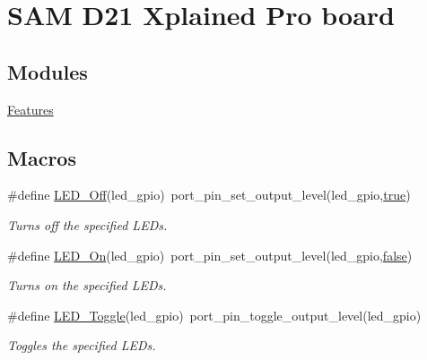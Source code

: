 \hypertarget{group__samd21__xplained__pro__group}{}\section{S\+AM D21 Xplained Pro board}
\label{group__samd21__xplained__pro__group}
\subsection*{Modules}
\begin{DoxyCompactItemize}
\item 
\mbox{\hyperlink{group__samd21__xplained__pro__features__group}{Features}}
\end{DoxyCompactItemize}
\subsection*{Macros}
\begin{DoxyCompactItemize}
\item 
\#define \mbox{\hyperlink{group__samd21__xplained__pro__group_ga4b0995a1d0a6a7bcbaf9f4096cc633c7}{L\+E\+D\+\_\+\+Off}}(led\+\_\+gpio)~port\+\_\+pin\+\_\+set\+\_\+output\+\_\+level(led\+\_\+gpio,\mbox{\hyperlink{group__group__sam0__utils_ga41f9c5fb8b08eb5dc3edce4dcb37fee7}{true}})
\begin{DoxyCompactList}\small\item\em Turns off the specified L\+E\+Ds. \end{DoxyCompactList}\item 
\#define \mbox{\hyperlink{group__samd21__xplained__pro__group_ga589335327be57d2761bfa96c55d62f29}{L\+E\+D\+\_\+\+On}}(led\+\_\+gpio)~port\+\_\+pin\+\_\+set\+\_\+output\+\_\+level(led\+\_\+gpio,\mbox{\hyperlink{group__group__sam0__utils_ga65e9886d74aaee76545e83dd09011727}{false}})
\begin{DoxyCompactList}\small\item\em Turns on the specified L\+E\+Ds. \end{DoxyCompactList}\item 
\#define \mbox{\hyperlink{group__samd21__xplained__pro__group_gac66f7ba408e0f06c78db8b3048126c8e}{L\+E\+D\+\_\+\+Toggle}}(led\+\_\+gpio)~port\+\_\+pin\+\_\+toggle\+\_\+output\+\_\+level(led\+\_\+gpio)
\begin{DoxyCompactList}\small\item\em Toggles the specified L\+E\+Ds. \end{DoxyCompactList}\end{DoxyCompactItemize}
